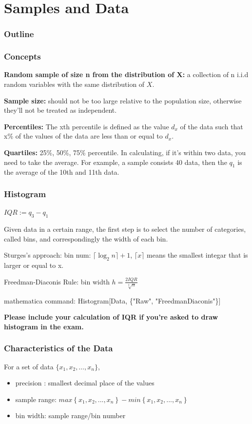 \documentclass{beamer}
\begin{document}
\section{Samples and Data}
\begin{frame}
    \frametitle{Outline}
    \tableofcontents[currentsection]
\end{frame}
\begin{frame}
    \frametitle{Concepts}

    \textbf{Random sample of size n from the distribution of X: }a collection of n i.i.d random variables with the same distribution of $X$.\par
    \vspace{0.3cm}
    \textbf{Sample size: }should not be too large relative to the population size, otherwise they'll not be treated as independent.\par
    \vspace{0.3cm}
    \textbf{Percentiles: }The xth percentile is defined as the value $d_x$ of the data such that x\% of
    the values of the data are less than or equal to $d_x$.\par
    \vspace{0.3cm}
    \textbf{Quartiles: } 25\%, 50\%, 75\% percentile. In calculating, if it's within two data, you need to take the average. For example, a sample consists 40 data, then the $q_1$ is the average of the 10th and 11th data.

\end{frame}

\begin{frame}
    \frametitle{Histogram}

    $IQR:=q_3-q_1$\par
    Given data in a certain range, the first step is to select the number of
    categories, called bins, and correspondingly the width of each bin.\par
    Sturges's approach: bin num: $\lceil \log_{2}n \rceil+1$, $\lceil x\rceil$ means the smallest integar that is larger or equal to x.\par
    Freedman-Diaconis Rule: bin width $h=\frac{2 IQR}{\sqrt[3]{n}}$\par
    mathematica command: Histogram[Data, \{"Raw", "FreedmanDiaconis"\}]\par
    \textbf{Please include your calculation of IQR if you're asked to draw histogram in the exam.}

\end{frame}

\begin{frame}
    \frametitle{Characteristics of the Data}
    For a set of data $\{x_1, x_2, \dots , x_n\}$, 
    \begin{itemize}
        \item precision : smallest decimal place of the values
        \item sample range: $max\left\{ x_1, x_2,...,x_n \right\}-min\left\{ x_1, x_2,...,x_n \right\}$
        \item bin width: sample range/bin number
        
    \end{itemize}

\end{frame}
\end{document}
